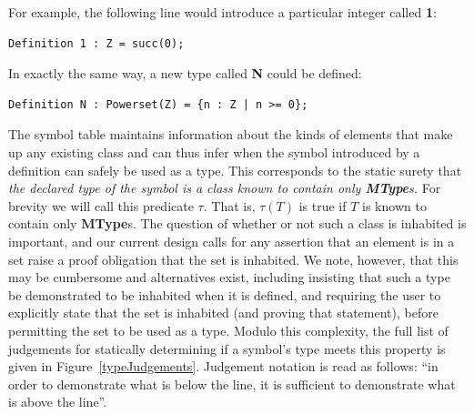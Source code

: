 For example, the following line would introduce a particular integer called \textbf{1}:

\begin{lstlisting}
Definition 1 : Z = succ(0);
\end{lstlisting}

In exactly the same way, a new type called \textbf{N} could be defined:

\begin{lstlisting}
Definition N : Powerset(Z) = {n : Z | n >= 0};
\end{lstlisting}

The symbol table maintains information about the kinds of elements that make up any existing class and can thus infer when the symbol introduced by a definition can safely be used as a type.  This corresponds to the static surety that \emph{the declared type of the symbol is a class known to contain only \textbf{MType}s.}  For brevity we will call this predicate $\tau$.  That is, $\tau(T)$ is true if $T$ is known to contain only \textbf{MType}s.  The question of whether or not such a class is inhabited is important, and our current design calls for any assertion that an element is in a set raise a proof obligation that the set is inhabited.  We note, however, that this may be cumbersome and alternatives exist, including insisting that such a type be demonstrated to be inhabited when it is defined, and requiring the user to explicitly state that the set is inhabited (and proving that statement), before permitting the set to be used as a type.  Modulo this complexity, the full list of judgements for statically determining if a symbol's type meets this property is given in Figure~\ref{typeJudgements}. Judgement notation is read as follows: ``in order to demonstrate what is below the line, it is sufficient to demonstrate what is above the line''.

